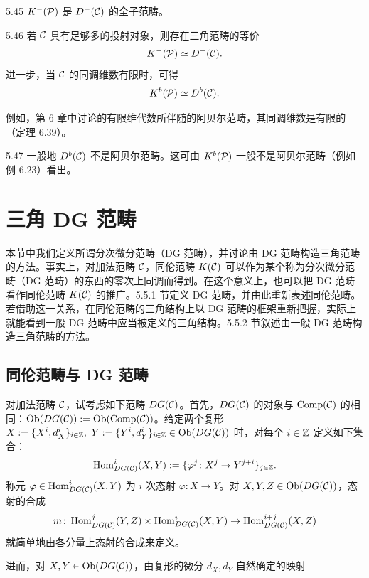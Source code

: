 \begin{theorem}{5.45} $K^{-}(\mathcal{P})$ 是 $D^{-}(\mathcal{C})$ 的全子范畴。\end{theorem}

\begin{theorem}{5.46} 若 $\mathcal{C}$ 具有足够多的投射对象，则存在三角范畴的等价
\[
  K^{-}(\mathcal{P}) \simeq D^{-}(\mathcal{C}).
\]
进一步，当 $\mathcal{C}$ 的同调维数有限时，可得
\[
  K^{b}(\mathcal{P}) \simeq D^{b}(\mathcal{C}).
\]
\end{theorem}

例如，第 6 章中讨论的有限维代数所伴随的阿贝尔范畴，其同调维数是有限的（定理 6.39）。

\begin{remark}{5.47} 一般地 $D^{b}(\mathcal{C})$ 不是阿贝尔范畴。这可由 $K^{b}(\mathcal{P})$ 一般不是阿贝尔范畴（例如例 6.23）看出。\end{remark}

\section{三角 DG 范畴}

本节中我们定义所谓分次微分范畴（DG 范畴），并讨论由 DG 范畴构造三角范畴的方法。事实上，对加法范畴 $\mathcal{C}$，同伦范畴 $K(\mathcal{C})$ 可以作为某个称为分次微分范畴（DG 范畴）的东西的零次上同调而得到。在这个意义上，也可以把 DG 范畴看作同伦范畴 $K(\mathcal{C})$ 的推广。5.5.1 节定义 DG 范畴，并由此重新表述同伦范畴。若借助这一关系，在同伦范畴的三角结构上以 DG 范畴的框架重新把握，实际上就能看到一般 DG 范畴中应当被定义的三角结构。5.5.2 节叙述由一般 DG 范畴构造三角范畴的方法。

\subsection{同伦范畴与 DG 范畴}

对加法范畴 $\mathcal{C}$，试考虑如下范畴 $DG(\mathcal{C})$。首先，$DG(\mathcal{C})$ 的对象与 $\operatorname{Comp}(\mathcal{C})$ 的相同：$\operatorname{Ob}(DG(\mathcal{C})) := \operatorname{Ob}(\operatorname{Comp}(\mathcal{C}))$。给定两个复形 $X := \{X^{i}, d^{i}_{X}\}_{i\in\mathbb{Z}},\ Y := \{Y^{i}, d^{i}_{Y}\}_{i\in\mathbb{Z}} \in \operatorname{Ob}(DG(\mathcal{C}))$ 时，对每个 $i \in \mathbb{Z}$ 定义如下集合：
\[
  \operatorname{Hom}^{i}_{DG(\mathcal{C})}(X,Y) := \{\varphi^{j}\colon X^{j} \to Y^{j+i}\}_{j\in\mathbb{Z}}.
\]
称元 $\varphi \in \operatorname{Hom}^{i}_{DG(\mathcal{C})}(X,Y)$ 为 $i$ 次态射 $\varphi\colon X \to Y$。对 $X,Y,Z \in \operatorname{Ob}(DG(\mathcal{C}))$，态射的合成
\[
  m \colon \operatorname{Hom}^{j}_{DG(\mathcal{C})}(Y,Z) \times \operatorname{Hom}^{i}_{DG(\mathcal{C})}(X,Y) \to \operatorname{Hom}^{i+j}_{DG(\mathcal{C})}(X,Z)
\]
就简单地由各分量上态射的合成来定义。

进而，对 $X,Y \in \operatorname{Ob}(DG(\mathcal{C}))$，由复形的微分 $d_{X}, d_{Y}$ 自然确定的映射

